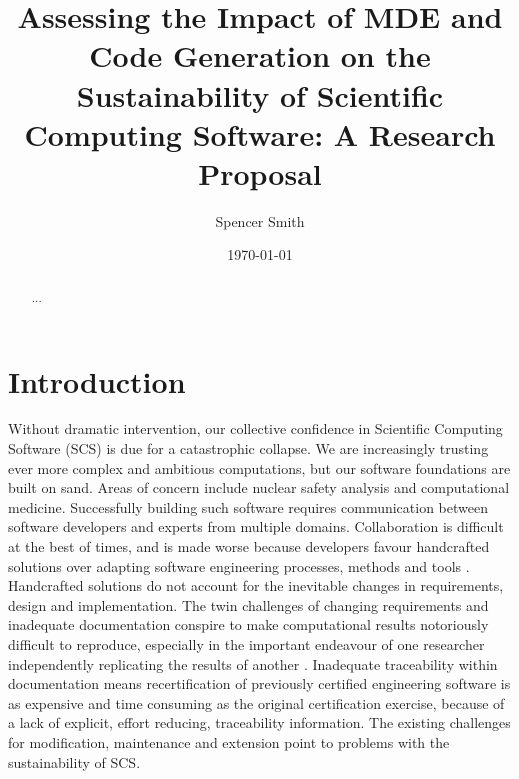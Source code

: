 \documentclass[12pt]{article}
\begin{document}
\title{Assessing the Impact of MDE and Code Generation on the Sustainability of
  Scientific Computing Software: A Research Proposal} 
\author{Spencer Smith}
\date{\today}
	
\maketitle

\begin{abstract}
  ...
\end{abstract}

\tableofcontents

\newpage

\section{Introduction}

Without dramatic intervention, our collective confidence in Scientific Computing
Software (SCS) is due for a catastrophic collapse.  We are increasingly trusting
ever more complex and ambitious computations, but our software foundations are
built on sand. Areas of concern include nuclear safety analysis and
computational medicine. Successfully building such software requires
communication between software developers and experts from multiple
domains. Collaboration is difficult at the best of times, and is made worse
because developers favour handcrafted solutions over adapting software
engineering processes, methods and tools \citep{FaulkEtAl2009}. Handcrafted
solutions do not account for the inevitable changes in requirements, design and
implementation. The twin challenges of changing requirements and inadequate
documentation conspire to make computational results notoriously difficult to
reproduce, especially in the important endeavour of one researcher independently
replicating the results of another \citep{Smith2018}.  Inadequate traceability
within documentation means re­certification of previously certified engineering
software is as expensive and time consuming as the original certification
exercise, because of a lack of explicit, effort reducing, traceability
information.  The existing challenges for modification, maintenance and
extension point to problems with the sustainability of SCS.
\end{document}
